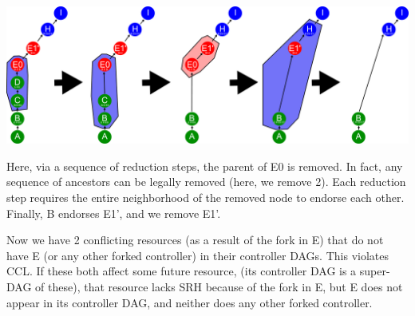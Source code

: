\documentclass[a4paper,USenglish,cleveref, autoref, thm-restate, anonymous]{lipics-v2021}
\begin{document}
\includegraphics[width=1\linewidth]{figs/local-reduce-example-blue-1.pdf}

Here, via a sequence of reduction steps, the parent of E0 is removed.
In fact, any sequence of ancestors can be legally removed (here, we remove 2).
Each reduction step requires the entire neighborhood of the removed node to endorse each other. 
Finally, B endorses E1', and we remove E1'.

Now we have 2 conflicting resources (as a result of the fork in E) that do not have E (or any other forked controller) in their controller DAGs.
This violates CCL. 
If these both affect some future resource, (its controller DAG is a super-DAG of these), that resource lacks SRH because of the fork in E, but E does not appear in its controller DAG, and neither does any other forked controller.
\end{document}
